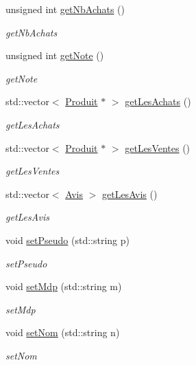 \begin{DoxyCompactItemize}
unsigned int \hyperlink{class_utilisateur_a5fd1e4951abad29ba9ae1ac8760c726d}{get\-Nb\-Achats} ()
\begin{DoxyCompactList}\small\item\em get\-Nb\-Achats \end{DoxyCompactList}\item 
unsigned int \hyperlink{class_utilisateur_a2727eb739e0065c9aac277b5d2703b7e}{get\-Note} ()
\begin{DoxyCompactList}\small\item\em get\-Note \end{DoxyCompactList}\item 
std\-::vector$<$ \hyperlink{class_produit}{Produit} $\ast$ $>$ \hyperlink{class_utilisateur_a98c52de15b6cb4cd90ab9843887ebea4}{get\-Les\-Achats} ()
\begin{DoxyCompactList}\small\item\em get\-Les\-Achats \end{DoxyCompactList}\item 
std\-::vector$<$ \hyperlink{class_produit}{Produit} $\ast$ $>$ \hyperlink{class_utilisateur_a1b40d3e45c297b261321c3846fb0c214}{get\-Les\-Ventes} ()
\begin{DoxyCompactList}\small\item\em get\-Les\-Ventes \end{DoxyCompactList}\item 
std\-::vector$<$ \hyperlink{class_avis}{Avis} $>$ \hyperlink{class_utilisateur_ae4bbe39c0dd8baccf7fcb1e706df9ceb}{get\-Les\-Avis} ()
\begin{DoxyCompactList}\small\item\em get\-Les\-Avis \end{DoxyCompactList}\item 
void \hyperlink{class_utilisateur_a8463c077b33ccc93c8e424a47b9bc369}{set\-Pseudo} (std\-::string p)
\begin{DoxyCompactList}\small\item\em set\-Pseudo \end{DoxyCompactList}\item 
void \hyperlink{class_utilisateur_a34f6a4cd57807390db2bfc3f880eec58}{set\-Mdp} (std\-::string m)
\begin{DoxyCompactList}\small\item\em set\-Mdp \end{DoxyCompactList}\item 
void \hyperlink{class_utilisateur_a20a32b47f2b080a4aead49e16bd06f44}{set\-Nom} (std\-::string n)
\begin{DoxyCompactList}\small\item\em set\-Nom \end{DoxyCompactList}\item 

\end{DoxyCompactItemize}
